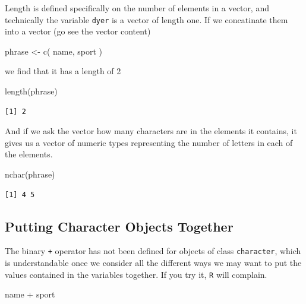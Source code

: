 \documentclass[
  letterpaper,
]{book}
\newenvironment{Shaded}{\begin{snugshade}}{\end{snugshade}}
\newcommand{\FunctionTok}[1]{\textcolor[rgb]{0.28,0.35,0.67}{#1}}
\newcommand{\NormalTok}[1]{\textcolor[rgb]{0.00,0.23,0.31}{#1}}
\newcommand{\OtherTok}[1]{\textcolor[rgb]{0.00,0.23,0.31}{#1}}
\newcommand{\SpecialCharTok}[1]{\textcolor[rgb]{0.37,0.37,0.37}{#1}}
\begin{document}
Length is defined specifically on the number of elements in a vector,
and technically the variable \texttt{dyer} is a vector of length one. If
we concatinate them into a vector (go see the vector content)

\begin{Shaded}
\begin{Highlighting}[]
\NormalTok{phrase }\OtherTok{\textless{}{-}} \FunctionTok{c}\NormalTok{( name, sport )}
\end{Highlighting}
\end{Shaded}

we find that it has a length of 2

\begin{Shaded}
\begin{Highlighting}[]
\FunctionTok{length}\NormalTok{(phrase)}
\end{Highlighting}
\end{Shaded}

\begin{verbatim}
[1] 2
\end{verbatim}

And if we ask the vector how many characters are in the elements it
contains, it gives us a vector of numeric types representing the number
of letters in each of the elements.

\begin{Shaded}
\begin{Highlighting}[]
\FunctionTok{nchar}\NormalTok{(phrase)}
\end{Highlighting}
\end{Shaded}

\begin{verbatim}
[1] 4 5
\end{verbatim}

\subsection{Putting Character Objects
Together}\label{putting-character-objects-together}

The binary \texttt{+} operator has not been defined for objects of class
\texttt{character}, which is understandable once we consider all the
different ways we may want to put the values contained in the variables
together. If you try it, \texttt{R} will complain.

\begin{Shaded}
\begin{Highlighting}[]
\NormalTok{name }\SpecialCharTok{+}\NormalTok{ sport}
\end{Highlighting}
\end{Shaded}
\end{document}
